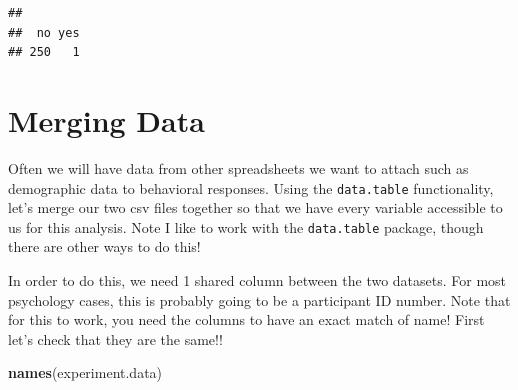 \documentclass[]{book}
\newenvironment{Shaded}{\begin{snugshade}}{\end{snugshade}}
\newcommand{\KeywordTok}[1]{\textcolor[rgb]{0.13,0.29,0.53}{\textbf{#1}}}
\newcommand{\DecValTok}[1]{\textcolor[rgb]{0.00,0.00,0.81}{#1}}
\newcommand{\StringTok}[1]{\textcolor[rgb]{0.31,0.60,0.02}{#1}}
\newcommand{\OperatorTok}[1]{\textcolor[rgb]{0.81,0.36,0.00}{\textbf{#1}}}
\newcommand{\NormalTok}[1]{#1}
\theoremstyle{definition}
\theoremstyle{definition}
\theoremstyle{definition}
\theoremstyle{remark}
\begin{document}
\begin{Shaded}
\end{Shaded}

\begin{verbatim}
## 
##  no yes 
## 250   1
\end{verbatim}

\section{Merging Data}\label{merging-data}

Often we will have data from other spreadsheets we want to attach such
as demographic data to behavioral responses. Using the
\texttt{data.table} functionality, let's merge our two csv files
together so that we have every variable accessible to us for this
analysis. Note I like to work with the \texttt{data.table} package,
though there are other ways to do this!

In order to do this, we need 1 shared column between the two datasets.
For most psychology cases, this is probably going to be a participant ID
number. Note that for this to work, you need the columns to have an
exact match of name! First let's check that they are the same!!

\begin{Shaded}
\begin{Highlighting}[]
\KeywordTok{names}\NormalTok{(experiment.data)}
\end{Highlighting}
\end{Shaded}
\end{document}
